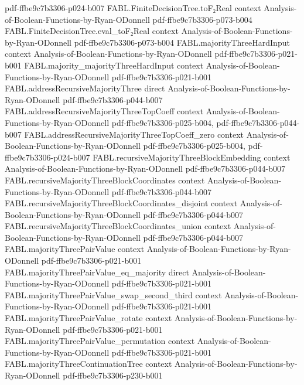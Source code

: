 \begin{theorem}
{    pdf-ffbe9c7b3306-p024-b007}
\proofstep
  {FABL.FiniteDecisionTree.toF₂Real}
  {context}
  {Analysis-of-Boolean-Functions-by-Ryan-ODonnell}
  {pdf-ffbe9c7b3306-p073-b004}
\proofstep
  {FABL.FiniteDecisionTree.eval_toF₂Real}
  {context}
  {Analysis-of-Boolean-Functions-by-Ryan-ODonnell}
  {pdf-ffbe9c7b3306-p073-b004}
\proofstep
  {FABL.majorityThreeHardInput}
  {context}
  {Analysis-of-Boolean-Functions-by-Ryan-ODonnell}
  {pdf-ffbe9c7b3306-p021-b001}
\proofstep
  {FABL.majority_majorityThreeHardInput}
  {context}
  {Analysis-of-Boolean-Functions-by-Ryan-ODonnell}
  {pdf-ffbe9c7b3306-p021-b001}
\proofstep
  {FABL.addressRecursiveMajorityThree}
  {direct}
  {Analysis-of-Boolean-Functions-by-Ryan-ODonnell}
  {pdf-ffbe9c7b3306-p044-b007}
\proofstep
  {FABL.addressRecursiveMajorityThreeTopCoeff}
  {context}
  {Analysis-of-Boolean-Functions-by-Ryan-ODonnell}
  {pdf-ffbe9c7b3306-p025-b004,
    pdf-ffbe9c7b3306-p044-b007}
\proofstep
  {FABL.addressRecursiveMajorityThreeTopCoeff_zero}
  {context}
  {Analysis-of-Boolean-Functions-by-Ryan-ODonnell}
  {pdf-ffbe9c7b3306-p025-b004,
    pdf-ffbe9c7b3306-p024-b007}
\proofstep
  {FABL.recursiveMajorityThreeBlockEmbedding}
  {context}
  {Analysis-of-Boolean-Functions-by-Ryan-ODonnell}
  {pdf-ffbe9c7b3306-p044-b007}
\proofstep
  {FABL.recursiveMajorityThreeBlockCoordinates}
  {context}
  {Analysis-of-Boolean-Functions-by-Ryan-ODonnell}
  {pdf-ffbe9c7b3306-p044-b007}
\proofstep
  {FABL.recursiveMajorityThreeBlockCoordinates_disjoint}
  {context}
  {Analysis-of-Boolean-Functions-by-Ryan-ODonnell}
  {pdf-ffbe9c7b3306-p044-b007}
\proofstep
  {FABL.recursiveMajorityThreeBlockCoordinates_union}
  {context}
  {Analysis-of-Boolean-Functions-by-Ryan-ODonnell}
  {pdf-ffbe9c7b3306-p044-b007}
\proofstep
  {FABL.majorityThreePairValue}
  {context}
  {Analysis-of-Boolean-Functions-by-Ryan-ODonnell}
  {pdf-ffbe9c7b3306-p021-b001}
\proofstep
  {FABL.majorityThreePairValue_eq_majority}
  {direct}
  {Analysis-of-Boolean-Functions-by-Ryan-ODonnell}
  {pdf-ffbe9c7b3306-p021-b001}
\proofstep
  {FABL.majorityThreePairValue_swap_second_third}
  {context}
  {Analysis-of-Boolean-Functions-by-Ryan-ODonnell}
  {pdf-ffbe9c7b3306-p021-b001}
\proofstep
  {FABL.majorityThreePairValue_rotate}
  {context}
  {Analysis-of-Boolean-Functions-by-Ryan-ODonnell}
  {pdf-ffbe9c7b3306-p021-b001}
\proofstep
  {FABL.majorityThreePairValue_permutation}
  {context}
  {Analysis-of-Boolean-Functions-by-Ryan-ODonnell}
  {pdf-ffbe9c7b3306-p021-b001}
\proofstep
  {FABL.majorityThreeContinuationTree}
  {context}
  {Analysis-of-Boolean-Functions-by-Ryan-ODonnell}
  {pdf-ffbe9c7b3306-p230-b001}

\end{theorem}
